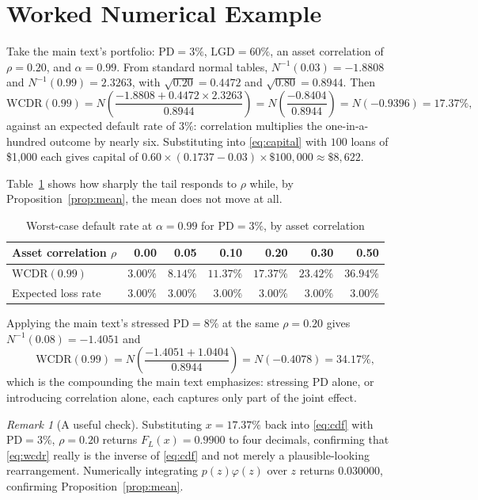 \documentclass[11pt]{article}
\theoremstyle{remark}
\newtheorem*{remark}{Remark}
\theoremstyle{definition}
\begin{document}
\section{Worked Numerical Example}
\label{sec:example}

Take the main text's portfolio: $\text{PD}=3\%$, $\text{LGD}=60\%$, an asset correlation of $\rho=0.20$, and $\alpha=0.99$. From standard normal tables, $N^{-1}(0.03) = -1.8808$ and $N^{-1}(0.99) = 2.3263$, with $\sqrt{0.20}=0.4472$ and $\sqrt{0.80}=0.8944$. Then
\begin{equation*}
\text{WCDR}(0.99) = N\!\left(\frac{-1.8808 + 0.4472 \times 2.3263}{0.8944}\right) = N\!\left(\frac{-0.8404}{0.8944}\right) = N(-0.9396) = 17.37\%,
\end{equation*}
against an expected default rate of $3\%$: correlation multiplies the one-in-a-hundred outcome by nearly six. Substituting into \eqref{eq:capital} with $100$ loans of \$1,000 each gives capital of $0.60\times(0.1737-0.03)\times\$100{,}000 \approx \$8{,}622$.

Table~\ref{tab:rho} shows how sharply the tail responds to $\rho$ while, by Proposition~\ref{prop:mean}, the mean does not move at all.

\begin{table}[htbp]
\centering
\caption{Worst-case default rate at $\alpha=0.99$ for $\text{PD}=3\%$, by asset correlation}
\label{tab:rho}
\begin{tabular}{lrrrrrr}
\toprule
Asset correlation $\rho$ & 0.00 & 0.05 & 0.10 & 0.20 & 0.30 & 0.50 \\
\midrule
$\text{WCDR}(0.99)$ & $3.00\%$ & $8.14\%$ & $11.37\%$ & $17.37\%$ & $23.42\%$ & $36.94\%$ \\
Expected loss rate & $3.00\%$ & $3.00\%$ & $3.00\%$ & $3.00\%$ & $3.00\%$ & $3.00\%$ \\
\bottomrule
\end{tabular}
\end{table}

Applying the main text's stressed $\text{PD}=8\%$ at the same $\rho=0.20$ gives $N^{-1}(0.08)=-1.4051$ and
\begin{equation*}
\text{WCDR}(0.99) = N\!\left(\frac{-1.4051 + 1.0404}{0.8944}\right) = N(-0.4078) = 34.17\%,
\end{equation*}
which is the compounding the main text emphasizes: stressing $\text{PD}$ alone, or introducing correlation alone, each captures only part of the joint effect.

\begin{remark}[A useful check]
\label{rem:check}
Substituting $x = 17.37\%$ back into \eqref{eq:cdf} with $\text{PD}=3\%$, $\rho=0.20$ returns $F_L(x) = 0.9900$ to four decimals, confirming that \eqref{eq:wcdr} really is the inverse of \eqref{eq:cdf} and not merely a plausible-looking rearrangement. Numerically integrating $p(z)\varphi(z)$ over $z$ returns $0.030000$, confirming Proposition~\ref{prop:mean}.
\end{remark}
\end{document}

